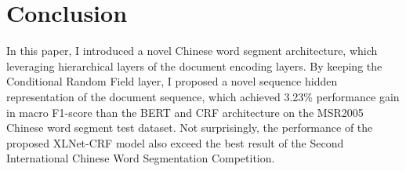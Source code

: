 \documentclass[11pt,a4paper]{article}
\begin{document}
%

\section{Conclusion}

In this paper, I introduced a novel Chinese word segment architecture, which leveraging hierarchical layers of the document encoding layers.
By keeping the Conditional Random Field layer, I proposed a novel sequence hidden representation of the document sequence, which achieved 3.23\% performance gain in macro F1-score than
the BERT and CRF architecture on the MSR2005 Chinese word segment test dataset.
Not surprisingly, the performance of the proposed XLNet-CRF model also exceed the best result of the Second International Chinese Word Segmentation Competition.





\end{document}
